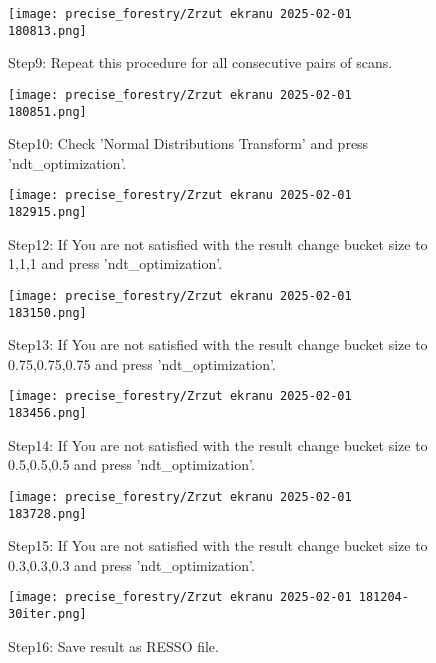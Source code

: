 \begin{figure}[H]
	\centering
	\texttt{[image: precise\_forestry/Zrzut ekranu 2025-02-01 180813.png]}
	\caption{Step9: Repeat this procedure for all consecutive pairs of scans.}
	\label{fig:pf14}
\end{figure}

\begin{figure}[H]
	\centering
	\texttt{[image: precise\_forestry/Zrzut ekranu 2025-02-01 180851.png]}
	\caption{Step10: Check 'Normal Distributions Transform' and press 'ndt\_optimization'.}
	\label{fig:pf15}
\end{figure}



\begin{figure}[H]
	\centering
	\texttt{[image: precise\_forestry/Zrzut ekranu 2025-02-01 182915.png]}
	\caption{Step12: If You are not satisfied with the result change bucket size to 1,1,1 and press 'ndt\_optimization'.}
	\label{fig:pf17}
\end{figure}

\begin{figure}[H]
	\centering
	\texttt{[image: precise\_forestry/Zrzut ekranu 2025-02-01 183150.png]}
	\caption{Step13: If You are not satisfied with the result change bucket size to 0.75,0.75,0.75 and press 'ndt\_optimization'.}
	\label{fig:pf18}
\end{figure}

\begin{figure}[H]
	\centering
	\texttt{[image: precise\_forestry/Zrzut ekranu 2025-02-01 183456.png]}
	\caption{Step14: If You are not satisfied with the result change bucket size to 0.5,0.5,0.5 and press 'ndt\_optimization'.}
	\label{fig:pf19}
\end{figure}

\begin{figure}[H]
	\centering
	\texttt{[image: precise\_forestry/Zrzut ekranu 2025-02-01 183728.png]}
	\caption{Step15: If You are not satisfied with the result change bucket size to 0.3,0.3,0.3 and press 'ndt\_optimization'.}
	\label{fig:pf20}
\end{figure}

\begin{figure}[H]
	\centering
	\texttt{[image: precise\_forestry/Zrzut ekranu 2025-02-01 181204-30iter.png]}
	\caption{Step16: Save result as RESSO file.}
	\label{fig:pf16}
\end{figure}\\

